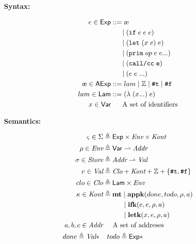 \documentclass[12pt,draft]{article}
\begin{document}
\begin{center}
\textbf{Syntax:}
\end{center}
\vspace{-7mm}
\begin{align*}
e \in \textsf{Exp} &::= \mae \\
				  & \;\;\;\;\; \;|\; \ifsyn{e}{e}{e}  \\
				  & \;\;\;\;\; \;|\; \letsyn{x}{e}{e} \\
				  & \;\;\;\;\; \;|\; \primsyn{op}{e}{e} \\
				  & \;\;\;\;\; \;|\; \callccsyn{e} \\
				  & \;\;\;\;\; \;|\; (e \; e \; ...) \\
\mae \in \textsf{AExp} &::= lam \;|\; \mathbb{Z} \;|\; \truesyn \;|\; \falsesyn \\
lam \in \textsf{Lam} &::= \lamsyn{x}{e} \\
x \in \textsf{Var} &\;\;\;\;\;\; \text{A set of identifiers}
\end{align*}
\vspace{-10mm}
\begin{center}
\textbf{Semantics:}
\end{center}
\vspace{-7mm}
\begin{align*}
\varsigma \in \Sigma &\triangleq \textsf{Exp} \times \textit{Env} \times \textit{Kont} \\
\rho \in \textit{Env} &\triangleq \textsf{Var} \rightharpoonup \textit{Addr} \\
\sigma \in \textit{Store} &\triangleq \textit{Addr} \rightharpoonup \textit{Val} \\
v \in \textit{Val} &\triangleq \textit{Clo} + \textit{Kont} + \mathbb{Z} + \{\texttt{\#t}, \texttt{\#f}\} \\
clo \in \textit{Clo} &\triangleq \textsf{Lam} \times \textit{Env} \\
\kappa \in \textit{Kont} &\triangleq \textbf{mt} \;|\; \textbf{appk}(done, todo, \rho, a) \\
					   &	\;\;\;\;\;\;\;\;\;\; \;|\; \textbf{ifk}(e, e, \rho, a) \\
					   &	\;\;\;\;\;\;\;\;\;\; \;|\; \textbf{letk}(x, e, \rho, a) \\
a,b,c \in \textit{Addr} &\;\;\;\;\; \text{A set of addreses} \\
done \triangleq \textit{Val}* \;\;&\;\; todo \triangleq \textsf{Exp}*
\end{align*}
\end{document}
